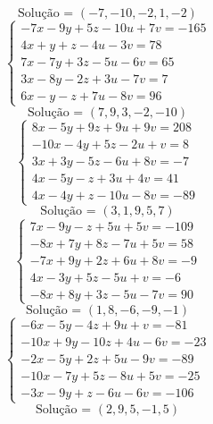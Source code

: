 \documentclass[12pt,oneside,a4paper,fleqn]{article}
\begin{document}
\begin{multicols*}{2}
\begin{equation*}
\text{Solução = }\left(-7,-10,-2,1,-2\right)
\end{equation*}
\vspace{\baselineskip}
\begin{equation*}
\begin{cases}
-7x-9y+5z-10u+7v=-165 \\
4x+y+z-4u-3v=78 \\
7x-7y+3z-5u-6v=65 \\
3x-8y-2z+3u-7v=7 \\
6x-y-z+7u-8v=96
\end{cases}
\end{equation*}
\begin{equation*}
\text{Solução = }\left(7,9,3,-2,-10\right)
\end{equation*}
\vspace{\baselineskip}
\begin{equation*}
\begin{cases}
8x-5y+9z+9u+9v=208 \\
-10x-4y+5z-2u+v=8 \\
3x+3y-5z-6u+8v=-7 \\
4x-5y-z+3u+4v=41 \\
4x-4y+z-10u-8v=-89
\end{cases}
\end{equation*}
\begin{equation*}
\text{Solução = }\left(3,1,9,5,7\right)
\end{equation*}
\vspace{\baselineskip}
\begin{equation*}
\begin{cases}
7x-9y-z+5u+5v=-109 \\
-8x+7y+8z-7u+5v=58 \\
-7x+9y+2z+6u+8v=-9 \\
4x-3y+5z-5u+v=-6 \\
-8x+8y+3z-5u-7v=90
\end{cases}
\end{equation*}
\begin{equation*}
\text{Solução = }\left(1,8,-6,-9,-1\right)
\end{equation*}
\vspace{\baselineskip}
\begin{equation*}
\begin{cases}
-6x-5y-4z+9u+v=-81 \\
-10x+9y-10z+4u-6v=-23 \\
-2x-5y+2z+5u-9v=-89 \\
-10x-7y+5z-8u+5v=-25 \\
-3x-9y+z-6u-6v=-106
\end{cases}
\end{equation*}
\begin{equation*}
\text{Solução = }\left(2,9,5,-1,5\right)
\end{equation*}
\vspace{\baselineskip}
\end{multicols*}
\end{document}
